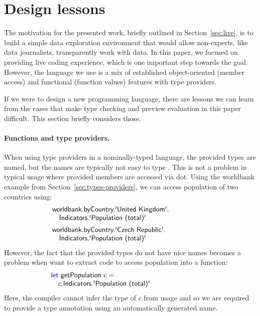 \documentclass[sigplan,10pt,review,anonymous]{acmart}\settopmatter{printfolios=true,printccs=false,printacmref=false}
\theoremstyle{plain}
\theoremstyle{definition}
\newcommand{\ident}[1]{\textnormal{\sffamily #1}}
\newcommand{\kvd}[1]{\textnormal{\textcolor{kvdclr}{\sffamily #1}}}
\begin{document}

\section{Design lessons}
\label{sec:design}

The motivation for the presented work, briefly outlined in Section~\ref{sec:live}, is to build a 
simple data exploration environment that would allow non-experts, like data journalists, 
transparently work with data. In this paper, we focused on providing live coding experience, 
which is one important step towards the goal. However, the language we use is a mix of established 
object-oriented (member access) and functional (function values) features with type providers.

If we were to design a new programming language, there are lessons we can learn from the 
cases that make type checking and preview evaluation in this paper difficult. This section 
briefly considers those. 

\paragraph{Functions and type providers.} When using type providers in a nominally-typed language,
the provided types are named, but the names are typically not easy to type \cite{fsdata}. This is
not a problem in typical usage where provided members are accessed via dot. Using the \ident{worldbank}
example from Section~\ref{sec:types-providers}, we can access population of two countries using:
%
\begin{equation*}
\begin{array}{l}
\ident{worldbank.byCountry.\textquotesingle United Kingdom\textquotesingle}.\\
\quad \ident{Indicators.\textquotesingle Population (total)\textquotesingle}\\[0.5em]
\ident{worldbank.byCountry.\textquotesingle Czech Republic\textquotesingle}.\\
\quad \ident{Indicators.\textquotesingle Population (total)\textquotesingle}\hspace{9em}
\end{array}
\end{equation*}
%
However, the fact that the provided types do not have nice names becomes a problem when want to 
extract code to access population into a function:
%
\begin{equation*}
\begin{array}{l}
\kvd{let}~\ident{getPopulation}~c=\\
\quad c.\ident{Indicators.\textquotesingle Population (total)\textquotesingle}\hspace{8.5em}
\end{array}
\end{equation*}
%
Here, the compiler cannot infer the type of $c$ from usage and so we are required to provide a
type annotation using an automatically generated name.
\end{document}
